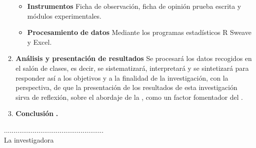 \documentclass[12pt,a4paper]{article}
\begin{document}
\begin{enumerate}
\begin{itemize}
		      \item \textbf{Instrumentos} Ficha de observación, ficha de opinión prueba
		            escrita y módulos experimentales.
		      \item \textbf{Procesamiento} \textbf{de datos} Mediante los programas estadísticos R Sweave y Excel.
	      \end{itemize}
	\item \textbf{Análisis y presentación de resultados} Se procesará los datos
	      recogidos en el salón de clases, es decir, se sistematizará, interpretará
	      y se sintetizará para responder así a los objetivos y a la finalidad
	      de la investigación, con la perspectiva, de que la presentación de
	      los resultados de esta investigación sirva de reflexión, sobre el
	      abordaje de la \MakeTextLowercase{\variablei}, como un factor
	      fomentador del \MakeTextLowercase{\variabled}.
	\item \textbf{Conclusión }\hipotesis\textbf{.}
\end{enumerate}
\textbf{\vspace{0.5cm}
}
\begin{center}
	....................................................\\
	La investigadora\\
	\autor
\end{center}

\clearpage
\end{document}
